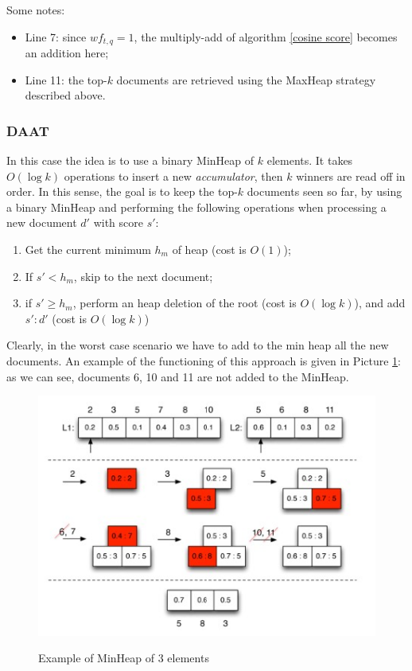 Some notes:

\begin{itemize}
    \item Line 7: since $wf_{t,q} = 1$, the multiply-add of algorithm \ref{cosine score} becomes an addition here;
    \item Line 11: the top-$k$ documents are retrieved using the MaxHeap strategy described above.
\end{itemize}

\subsubsection{DAAT}
In this case the idea is to use a binary MinHeap of $k$ elements. It takes $O(\log k)$ operations to insert a new \textit{accumulator}, then $k$ winners are read off in order. In this sense, the goal is to keep the top-$k$ documents seen so far, by using a binary MinHeap and performing the following operations when processing a new document $d'$ with score $s'$:

\begin{enumerate}
    \item Get the current minimum $h_m$ of heap (cost is $O(1)$);
    \item If $s' < h_m$, skip to the next document;
    \item if $s' \geq h_m$, perform an heap deletion of the root (cost is $O(\log k)$), and add $s':d'$ (cost is $O(\log k)$)
\end{enumerate}

Clearly, in the worst case scenario we have to add to the min heap all the new documents. An example of the functioning of this approach is given in Picture \ref{min heap ex}: as we can see, documents 6, 10 and 11 are not added to the MinHeap.

\begin{figure}[h!]
		\centering
		\includegraphics[scale = 2.0]{img/min heap ex.jpg}
		\label{min heap ex}
        \caption{Example of MinHeap of 3 elements}
\end{figure}


